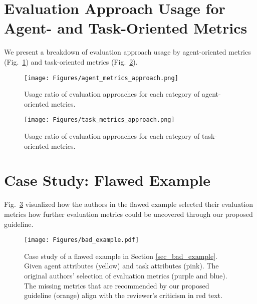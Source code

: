 \section{Evaluation Approach Usage for Agent- and Task-Oriented Metrics}
We present a breakdown of evaluation approach usage by agent-oriented metrics (Fig.~\ref{fig:stacked-bar-agent-oriented}) and task-oriented metrics (Fig.~\ref{fig:stacked-bar-task-oriented}).

\begin{figure}[t]
    \centering
    \texttt{[image: Figures/agent\_metrics\_approach.png]}
    \caption{Usage ratio of evaluation approaches for each category of agent-oriented metrics.}
    \label{fig:stacked-bar-agent-oriented}
\end{figure}


\begin{figure}[t]
    \centering
    \texttt{[image: Figures/task\_metrics\_approach.png]}
    \caption{Usage ratio of evaluation approaches for each category of task-oriented metrics.}
    \label{fig:stacked-bar-task-oriented}
\end{figure}


% 
% 

\section{Case Study: Flawed Example}
\label{appendix:bad_example}

Fig.~\ref{fig:bad example} visualized how the authors in the flawed example selected their evaluation metrics how further evaluation metrics could be uncovered through our proposed guideline.

\begin{figure}[t]
    \centering
    \texttt{[image: Figures/bad\_example.pdf]}
    \caption{Case study of a flawed example in Section \ref{sec_bad_example}. Given agent attributes (yellow) and task attributes (pink). The original authors' selection of evaluation metrics (purple and blue). The missing metrics that are recommended by our proposed guideline (orange) align with the reviewer's criticism in red text.}
    \label{fig:bad example}
\end{figure}


